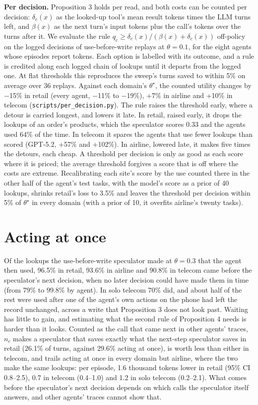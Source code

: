 \documentclass[10pt,twocolumn,letterpaper]{article}
\newcommand{\runin}[1]{{\sffamily\bfseries\color{accent}#1}}
\begin{document}
\runin{Per decision.} Proposition 3 holds per read, and both costs can be counted per decision: \(\delta_c(x)\) as the looked-up tool's mean result tokens times the LLM turns left, and \(\beta(x)\) as the next turn's input tokens plus the call's tokens over the turns after it. We evaluate the rule \(q_c \ge \delta_c(x)/(\beta(x)+\delta_c(x))\) off-policy on the logged decisions of use-before-write replays at \(\theta = 0.1\), for the eight agents whose episodes report tokens. Each option is labelled with its outcome, and a rule is credited along each logged chain of lookups until it departs from the logged one. At flat thresholds this reproduces the sweep's turns saved to within 5\% on average over 36 replays. Against each domain's \(\theta^\star\), the counted utility changes by −15\% in retail (every agent, −11\% to −19\%), +7\% in airline and +10\% in telecom (\texttt{scripts/per\_decision.py}). The rule raises the threshold early, where a detour is carried longest, and lowers it late. In retail, raised early, it drops the lookups of an order's products, which the speculator scores 0.33 and the agents used 64\% of the time. In telecom it spares the agents that use fewer lookups than scored (GPT-5.2, +57\% and +102\%). In airline, lowered late, it makes five times the detours, each cheap. A threshold per decision is only as good as each score where it is priced; the average threshold forgives a score that is off where the costs are extreme. Recalibrating each site's score by the use counted there in the other half of the agent's test tasks, with the model's score as a prior of 40 lookups, shrinks retail's loss to 3.5\% and leaves the threshold per decision within 5\% of \(\theta^\star\) in every domain (with a prior of 10, it overfits airline's twenty tasks).

\section{Acting at once}\label{acting-at-once}

Of the lookups the use-before-write speculator made at \(\theta = 0.3\) that the agent then used, 96.5\% in retail, 93.6\% in airline and 90.8\% in telecom came before the speculator's next decision, when no later decision could have made them in time (from 79\% to 99.8\% by agent). In solo telecom 70\% did, and about half of the rest were used after one of the agent's own actions on the phone had left the record unchanged, across a write that Proposition 3 does not look past. Waiting has little to gain, and estimating what the second rule of Proposition 4 needs is harder than it looks. Counted as the call that came next in other agents' traces, \(n_c\) makes a speculator that saves exactly what the next-step speculator saves in retail (26.1\% of turns, against 29.6\% acting at once), is worth less than either in telecom, and trails acting at once in every domain but airline, where the two make the same lookups: per episode, 1.6 thousand tokens lower in retail (95\% CI 0.8--2.5), 0.7 in telecom (0.4--1.0) and 1.2 in solo telecom (0.2--2.1). What comes before the speculator's next decision depends on which calls the speculator itself answers, and other agents' traces cannot show that.
\end{document}
